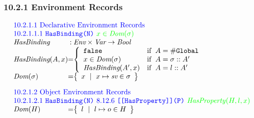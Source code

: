 \documentclass[a4paper, leqno]{amsart}
\newcommand{\mkst}[2]{#1::#2}
\def\inblue{\color{blue}}
\def\ingreen{\color{green}}
\newcommand{\false}{{\tt false}}
\newcommand{\er}{\ensuremath{\sigma}}
\newcommand{\Bool}{\emph{Bool}}
\newcommand{\Var}{\emph{Var}}
\newcommand{\Env}{\emph{Env}}
\renewcommand{\lg}{{\tt \#Global}}
\newcommand{\hf}[1]{\emph{#1}}
\newcommand{\ifc}[1]{{\rm if}\begin{array}[t]{l}#1\end{array}}
\newcommand{\set}[1]{\left\{\begin{array}{l}#1\end{array}\right\}}
\def\inblue{\color{blue}}
\begin{document}
\subsubsection*{10.2.1 Environment Records}

\[
\begin{array}{l@{}c@{}l}
\multicolumn{3}{l}{\mbox{{\inblue 10.2.1.1 Declarative Environment Records}}}\\
\multicolumn{3}{l}{\mbox{\inblue 10.2.1.1.1 {\tt HasBinding(N)} {\ingreen$x\in\hf{Dom}(\er)$}}}\\
\hf{HasBinding} & :& \Env \times \Var \rightarrow \Bool \\
\hf{HasBinding}(A, x) &=&
\left\{\begin{array}{ll}
\false &\ifc{A = \lg}\\
x \in \hf{Dom}(\er) &\ifc{A = \mkst{\er}{A'}}\\
\hf{HasBinding}(A',x) &\ifc{A = \mkst{l}{A'}}\\
\end{array}
\right.
 \\[1em]
\hf{Dom}(\er) &=& \set{x\ \mid\ x\mapsto \emph{sv} \in \er} \\[1em]

\multicolumn{3}{l}{\mbox{{\inblue 10.2.1.2 Object Environment Records}}}\\
\multicolumn{3}{l}{\mbox{\inblue 10.2.1.2.1 {\tt HasBinding(N)}
8.12.6 {\tt [[HasProperty]](P)}
{\ingreen \hf{HasProperty}$(H,l,x)$}}}\\
\hf{Dom}(H) &=& \set{l\ \mid\ l\mapsto o \in H} \\[1em]


\end{array}
\]
\end{document}
